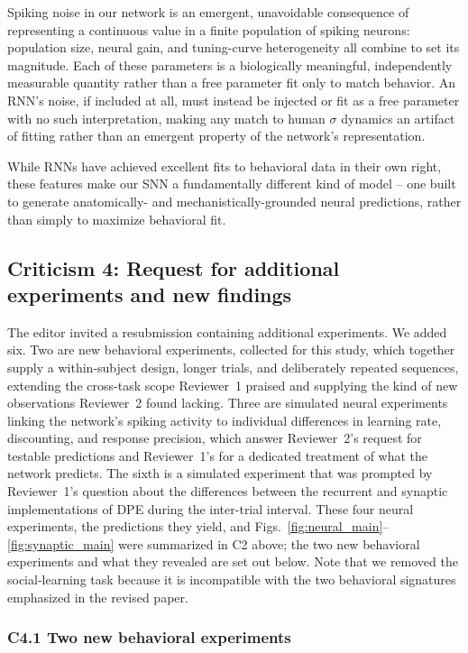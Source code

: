 \begin{ms}
Spiking noise in our network is an emergent, unavoidable consequence of representing a continuous value in a finite population of spiking neurons: population size, neural gain, and tuning-curve heterogeneity all combine to set its magnitude. Each of these parameters is a biologically meaningful, independently measurable quantity rather than a free parameter fit only to match behavior. An RNN's noise, if included at all, must instead be injected or fit as a free parameter with no such interpretation, making any match to human $\sigma$ dynamics an artifact of fitting rather than an emergent property of the network's representation.

While RNNs have achieved excellent fits to behavioral data in their own right, these features make our SNN a fundamentally different kind of model -- one built to generate anatomically- and mechanistically-grounded neural predictions, rather than simply to maximize behavioral fit.
\end{ms}


\subsection*{Criticism 4: Request for additional experiments and new findings}

The editor invited a resubmission containing additional experiments. We added six. Two are new behavioral experiments, collected for this study, which together supply a within-subject design, longer trials, and deliberately repeated sequences, extending the cross-task scope Reviewer~1 praised and supplying the kind of new observations Reviewer~2 found lacking. Three are simulated neural experiments linking the network's spiking activity to individual differences in learning rate, discounting, and response precision, which answer Reviewer~2's request for testable predictions and Reviewer~1's for a dedicated treatment of what the network predicts. The sixth is a simulated experiment that was prompted by Reviewer~1's question about the differences between the recurrent and synaptic implementations of DPE during the inter-trial interval. These four neural experiments, the predictions they yield, and Figs.~\ref{fig:neural_main}--\ref{fig:synaptic_main} were summarized in C2 above; the two new behavioral experiments and what they revealed are set out below. Note that we removed the social-learning task because it is incompatible with the two behavioral signatures emphasized in the revised paper.

\subsubsection*{C4.1 Two new behavioral experiments}

